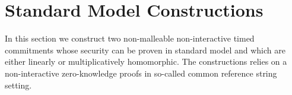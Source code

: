 \section{Standard Model Constructions}
In this section we construct two non-malleable non-interactive timed commitments whose security can be proven in standard model and which are either linearly or multiplicatively homomorphic.  The constructions relies on a non-interactive zero-knowledge proofs in so-called common reference string setting. 






